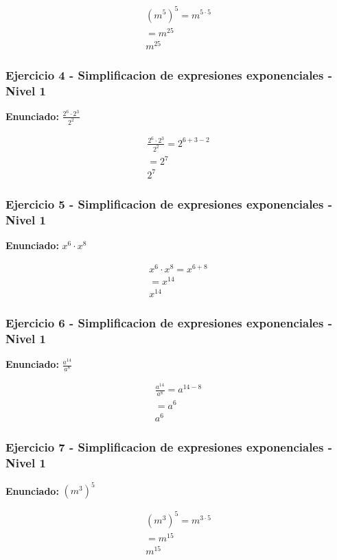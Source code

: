 \documentclass[12pt,a4paper]{article}
\begin{document}
\[
\begin{aligned}
\left(m^{5}\right)^{5}=m^{5\cdot 5}\\
=m^{25}\\
\boxed{m^{25}}
\end{aligned}
\]


\subsubsection*{Ejercicio 4 - Simplificacion de expresiones exponenciales - Nivel 1}
\textbf{Enunciado:} \(\frac{2^{6}\cdot 2^{3}}{2^{2}}\)

\[
\begin{aligned}
\frac{2^{6}\cdot 2^{3}}{2^{2}}=2^{6+3-2}\\
=2^{7}\\
\boxed{2^{7}}
\end{aligned}
\]


\subsubsection*{Ejercicio 5 - Simplificacion de expresiones exponenciales - Nivel 1}
\textbf{Enunciado:} \(x^{6}\cdot x^{8}\)

\[
\begin{aligned}
x^{6}\cdot x^{8}=x^{6+8}\\
=x^{14}\\
\boxed{x^{14}}
\end{aligned}
\]


\subsubsection*{Ejercicio 6 - Simplificacion de expresiones exponenciales - Nivel 1}
\textbf{Enunciado:} \(\frac{a^{14}}{a^{8}}\)

\[
\begin{aligned}
\frac{a^{14}}{a^{8}}=a^{14-8}\\
=a^{6}\\
\boxed{a^{6}}
\end{aligned}
\]


\subsubsection*{Ejercicio 7 - Simplificacion de expresiones exponenciales - Nivel 1}
\textbf{Enunciado:} \(\left(m^{3}\right)^{5}\)

\[
\begin{aligned}
\left(m^{3}\right)^{5}=m^{3\cdot 5}\\
=m^{15}\\
\boxed{m^{15}}
\end{aligned}
\]
\end{document}
